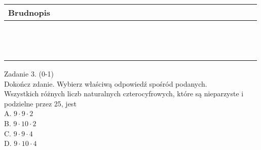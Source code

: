 \documentclass[10pt]{article}
\begin{document}
\begin{center}
\begin{tabular}{|c|c|c|c|c|c|c|c|c|c|c|c|c|c|c|c|c|c|c|c|c|c|c|c|c|c|c|c|c|c|c|}
\hline
\multicolumn{6}{|l|}{Brudnopis} &  &  &  &  &  &  &  &  &  &  &  &  &  &  &  &  &  &  &  &  &  &  &  &  &  \\
\hline
 &  &  &  &  &  &  &  &  &  &  &  &  &  &  &  &  &  &  &  &  &  &  &  &  &  &  &  &  &  &  \\
\hline
 &  &  &  &  &  &  &  &  &  &  &  &  &  &  &  &  &  &  &  &  &  &  &  &  &  &  &  &  &  &  \\
\hline
 &  &  &  &  &  &  &  &  &  &  &  &  &  &  &  &  &  &  &  &  &  &  &  &  &  &  &  &  &  &  \\
\hline
 &  &  &  &  &  &  &  &  &  &  &  &  &  &  &  &  &  &  &  &  &  &  &  &  &  &  &  &  &  &  \\
\hline
 &  &  &  &  &  &  &  &  &  &  &  &  &  &  &  &  &  &  &  &  &  &  &  &  &  &  &  &  &  &  \\
\hline
 &  &  &  &  &  &  &  &  &  &  &  &  &  &  &  &  &  &  &  &  &  &  &  &  &  &  &  &  &  &  \\
\hline
 &  &  &  &  &  &  &  &  &  &  &  &  &  &  &  &  &  &  &  &  &  &  &  &  &  &  &  &  &  &  \\
\hline
 &  &  &  &  &  &  &  &  &  &  &  &  &  &  &  &  &  &  &  &  &  &  &  &  &  &  &  &  &  &  \\
\hline
 &  &  &  &  &  &  &  &  &  &  &  &  &  &  &  &  &  &  &  &  &  &  &  &  &  &  &  &  &  &  \\
\hline
 &  &  &  &  &  &  &  &  &  &  &  &  &  &  &  &  &  &  &  &  &  &  &  &  &  &  &  &  &  &  \\
\hline
 &  &  &  &  &  &  &  &  &  &  &  &  &  &  &  &  &  &  &  &  &  &  &  &  &  &  &  &  &  &  \\
\hline
 &  &  &  &  &  &  &  &  &  &  &  &  &  &  &  &  &  &  &  &  &  &  &  &  &  &  &  &  &  &  \\
\hline
 &  &  &  &  &  &  &  &  &  &  &  &  &  &  &  &  &  &  &  &  &  &  &  &  &  &  &  &  &  &  \\
\hline
\end{tabular}
\end{center}

Zadanie 3. (0-1)\\
Dokończ zdanie. Wybierz właściwą odpowiedź spośród podanych.\\
Wszystkich różnych liczb naturalnych czterocyfrowych, które są nieparzyste i podzielne przez 25, jest\\
A. \(9 \cdot 9 \cdot 2\)\\
B. \(9 \cdot 10 \cdot 2\)\\
C. \(9 \cdot 9 \cdot 4\)\\
D. \(9 \cdot 10 \cdot 4\)
\end{document}
